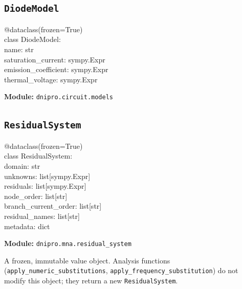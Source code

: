 \documentclass[11pt,a4paper]{article}
\newcommand{\code}[1]{\texttt{#1}}
\newenvironment{apisig}{%
  \begin{trivlist}\item\relax\ttfamily\small
}{%
  \end{trivlist}
}
\begin{document}
\subsection{\texttt{DiodeModel}}
\label{api:diodemodel}

\begin{apisig}
@dataclass(frozen=True) \\
class DiodeModel: \\
\quad name: str \\
\quad saturation\_current: sympy.Expr \\
\quad emission\_coefficient: sympy.Expr \\
\quad thermal\_voltage: sympy.Expr
\end{apisig}

\textbf{Module:} \code{dnipro.circuit.models}

\subsection{\texttt{ResidualSystem}}
\label{api:residualsystem}

\begin{apisig}
@dataclass(frozen=True) \\
class ResidualSystem: \\
\quad domain: str \\
\quad unknowns: list[sympy.Expr] \\
\quad residuals: list[sympy.Expr] \\
\quad node\_order: list[str] \\
\quad branch\_current\_order: list[str] \\
\quad residual\_names: list[str] \\
\quad metadata: dict
\end{apisig}

\textbf{Module:} \code{dnipro.mna.residual\_system}

A frozen, immutable value object.
Analysis functions (\code{apply\_numeric\_substitutions},
\code{apply\_frequency\_substitution}) do not modify this object;
they return a new \code{ResidualSystem}.
\end{document}
